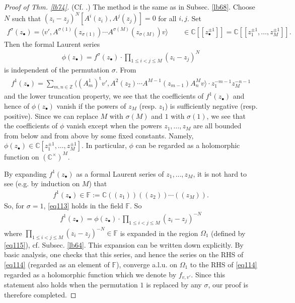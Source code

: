 \documentclass[12pt,a4paper,notitlepage]{article}
\theoremstyle{definition}
\theoremstyle{plain}
\newcommand{\tr}{\mathrm{t}} %
\newcommand{\bk}[1]{\langle {#1}\rangle}
\newcommand{\bigbk}[1]{\big\langle {#1}\big\rangle}
\newcommand{\mbb}{\mathbb}
\newcommand{\blt}{\bullet}
\newcommand{\Cbb}{\mathbb C}
\newcommand{\Zbb}{\mathbb Z}
\numberwithin{equation}{section}
\begin{document}
\begin{proof}[Proof of Thm. \ref{lb74}] (Cf. \cite{FHL93}.)
The method is the same as in Subsec. \ref{lb68}. Choose $N$ such that $(z_i-z_j)^N[A^i(z_i),A^j(z_j)]=0$ for all $i,j$. Set
\begin{align}
f^\sigma(z_\blt)=\bigbk{v',A^{\sigma(1)}(z_{\sigma(1)})\cdots A^{\sigma(M)}(z_{\sigma(M)})v}\qquad\in\Cbb[[z_\blt^{\pm1}]]=\Cbb[[z_1^{\pm1},\dots,z_M^{\pm1}]].	
\end{align}
Then the formal Laurent series
\begin{align}
\phi(z_\blt)=f^\sigma(z_\blt)	\cdot \prod_{1\leq i<j\leq M}(z_i-z_j)^N\label{eq113}
\end{align}
is independent of the permutation $\sigma$. From
\begin{align*}
f^1(z_\blt)=\sum_{m,n\in\Zbb}\bk{(A^1_m)^\tr v',A^2(z_2)\cdots A^{M-1}(z_{m-1})A^M_nv}\cdot z_1^{-m-1}z_M^{-n-1}
\end{align*}
and the lower truncation property, we see that the coefficients of $f^1(z_\blt)$ and hence of $\phi(z_\blt)$ vanish if the powers of $z_M$ (resp. $z_1$) is sufficiently negative (resp. positive). Since we can replace $M$ with $\sigma(M)$ and $1$ with $\sigma(1)$, we see that the coefficients of $\phi$ vanish except when the powers $z_1,\dots,z_M$ are all bounded from below and from above by some fixed constants. Namely, $\phi(z_\blt)\in\Cbb[z_1^{\pm1},\dots,z_M^{\pm1}]$. In particular, $\phi$ can be regarded as a holomorphic function on $(\Cbb^\times)^M$.

By expanding $f^1(z_\blt)$ as a formal Laurent series of $z_1,\dots,z_M$, it is not hard to see (e.g. by induction on $M$) that
\begin{align}
	f^1(z_\blt)\in\mbb F:=\Cbb((z_1))((z_2))\cdots((z_M)).
\end{align}
So, for $\sigma=1$, \eqref{eq113} holds in the field $\mbb F$. So
\begin{align}
f^1(z_\blt)=\phi(z_\blt)\cdot\prod_{1\leq i<j\leq M}(z_i-z_j)^{-N}	\label{eq114}
\end{align}
where $\prod_{1\leq i<j\leq M}(z_i-z_j)^{-N}\in\mbb F$ is expanded in the region $\Omega_1$ (defined by \eqref{eq115}), cf. Subsec. \ref{lb64}. This expansion can be written down explicitly. By basic analysis, one checks that this series, and hence the series on the RHS of \eqref{eq114} (regarded as an element of $\mbb F$), converge a.l.u. on $\Omega_1$ to the RHS of \eqref{eq114} regarded as a holomorphic function which we denote by $f_{v,v'}$. Since this statement also holds when the permutation $1$ is replaced by any $\sigma$, our proof is therefore completed.
\end{proof}
\end{document}
